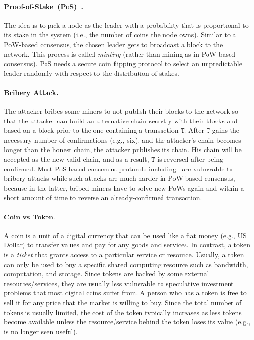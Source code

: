 \documentclass[11pt]{article}
\theoremstyle{mytheoremstyle}
\begin{document}
\paragraph{Proof-of-Stake~(PoS)~\cite{cryptoeprint:2016:889}.} The idea is to pick a node as the leader with a probability that is proportional to its stake in the system (i.e., the number of coins the node owns). Similar to a PoW-based consensus, the chosen leader gets to broadcast a block to the network. This process is called \emph{minting} (rather than mining as in PoW-based consensus). PoS needs a secure coin flipping protocol to select an unpredictable leader randomly with respect to the distribution of stakes.

\paragraph{Bribery Attack.} The attacker bribes some miners to not publish their blocks to the network so that the attacker can build an alternative chain secretly with their blocks and based on a block prior to the one containing a transaction $\mathtt{T}$. After $\mathtt{T}$ gains the necessary number of confirmations (e.g., six), and the attacker's chain becomes longer than the honest chain, the attacker publishes its chain. His chain will be accepted as the new valid chain, and as a result, $\mathtt{T}$ is reversed after being confirmed. Most PoS-based consensus protocols including~\cite{cryptoeprint:2016:889,algorand16} are vulnerable to bribery attacks while such attacks are much harder in PoW-based consensus, because in the latter, bribed miners have to solve new PoWs again and within a short amount of time to reverse an already-confirmed transaction.

\paragraph{Coin vs Token.} A coin is a unit of a digital currency that can be used like a fiat money (e.g., US Dollar) to transfer values and pay for any goods and services. In contrast, a token is a \emph{ticket} that grants access to a particular service or resource. Usually, a token can only be used to buy a specific shared computing resource such as bandwidth, computation, and storage. Since tokens are backed by some external resources/services, they are usually less vulnerable to speculative investment problems that most digital coins suffer from. A person who has a token is free to sell it for any price that the market is willing to buy. Since the total number of tokens is usually limited, the cost of the token typically increases as less tokens become available unless the resource/service behind the token loses its value (e.g., is no longer seen useful).
\end{document}
